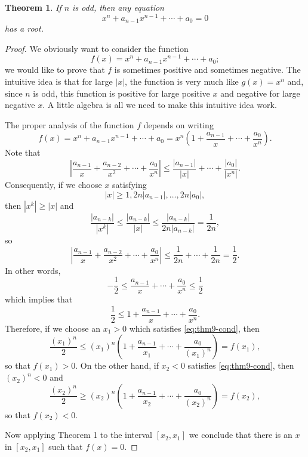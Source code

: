 \documentclass{article}
\numberwithin{definition}{subsection}
\numberwithin{lemma}{subsection}
\newtheorem{theorem}{Theorem}
\numberwithin{theorem}{subsection}
\begin{document}
\begin{theorem}
  If $n$ is odd, then any equation \[
    x^n + a_{n-1}x^{n-1} + \cdots + a_0 = 0
  \] has a root.
\end{theorem}
\begin{proof}
  We obviously want to consider the function \[
    f(x) = x^n + a_{n-1}x^{n-1} + \cdots + a_0;
  \] we would like to prove that $f$ is sometimes positive and sometimes
  negative. The intuitive idea is that for large $|x|$, the function is very
  much like $g(x) = x^n$ and, since $n$ is odd, this function is positive for
  large positive $x$ and negative for large negative $x$. A little algebra is
  all we need to make this intuitive idea work.

  The proper analysis of the function $f$ depends on writing \[
    f(x) = x^n + a_{n-1}x^{n-1} + \cdots + a_0
    = x^n \left( 1 + \frac{a_{n-1}}{x} + \cdots + \frac{a_0}{x^n} \right).
  \] Note that \[
    \left| \frac{a_{n-1}}{x} + \frac{a_{n-2}}{x^2} + \cdots + \frac{a_0}{x^n}
      \right| \leq \frac{|a_{n-1}|}{|x|} + \cdots + \frac{|a_0|}{|x^n|}.
  \] Consequently, if we choose $x$ satisfying \[
    \label{eq:thm9-cond} \tag{*}
    |x| \geq 1, 2n|a_{n-1}|, \ldots, 2n|a_0|,
  \] then $|x^k| \geq |x|$ and \[
    \frac{|a_{n-k}|}{|x^k|} \leq \frac{|a_{n-k}|}{|x|}
    \leq \frac{|a_{n-k}|}{2n |a_{n-k}|}
    = \frac{1}{2n},
  \] so \[
    \left| \frac{a_{n-1}}{x} + \frac{a_{n-2}}{x^2} + \cdots + \frac{a_0}{x^n}
      \right| \leq \frac{1}{2n} + \cdots + \frac{1}{2n} = \frac{1}{2}.
  \] In other words, \[
    -\frac{1}{2} \leq \frac{a_{n-1}}{x} + \cdots + \frac{a_0}{x^n} \leq
      \frac{1}{2}
  \] which implies that \[
    \frac{1}{2} \leq 1 + \frac{a_{n-1}}{x} + \cdots + \frac{a_0}{x^n}.
  \] Therefore, if we choose an $x_1 > 0$ which satisfies \eqref{eq:thm9-cond},
  then \[
    \frac{(x_1)^n}{2}
    \leq (x_1)^n \left( 1 + \frac{a_{n-1}}{x_1} + \cdots + \frac{a_0}{(x_1)^n}
    \right)
    = f(x_1),
  \] so that $f(x_1) > 0$. On the other hand, if $x_2 < 0$ satisfies
  \eqref{eq:thm9-cond}, then $(x_2)^n < 0$ and \[
    \frac{(x_2)^n}{2}
    \geq (x_2)^n \left( 1 + \frac{a_{n-1}}{x_2} + \cdots + \frac{a_0}{(x_2)^n}
    \right)
    = f(x_2),
  \] so that $f(x_2) < 0$.

  Now applying Theorem 1 to the interval $[x_2, x_1]$ we conclude that there is
  an $x$ in $[x_2, x_1]$ such that $f(x) = 0$.
\end{proof}
\end{document}

